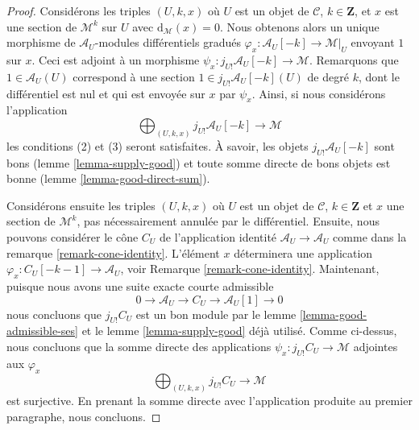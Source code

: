 \begin{proof}
Considérons les triples $(U, k, x)$ où $U$ est un objet de $\mathcal{C}$, $k \in \mathbf{Z}$, et $x$ est une section de $\mathcal{M}^k$ sur $U$ avec $\text{d}_\mathcal{M}(x) = 0$.
Nous obtenons alors un unique morphisme de $\mathcal{A}_U$-modules différentiels gradués $\varphi_x : \mathcal{A}_U[-k] \to \mathcal{M}|_U$ envoyant $1$ sur $x$.
Ceci est adjoint à un morphisme $\psi_x : j_{U!}\mathcal{A}_U[-k] \to \mathcal{M}$.
Remarquons que $1 \in \mathcal{A}_U(U)$ correspond à une section $1 \in j_{U!}\mathcal{A}_U[-k](U)$ de degré $k$, dont le différentiel est nul et qui est envoyée sur $x$ par $\psi_x$.
Ainsi, si nous considérons l'application
$$
\bigoplus\nolimits_{(U, k, x)} j_{U!}\mathcal{A}_U[-k]
\longrightarrow
\mathcal{M}
$$
les conditions (2) et (3) seront satisfaites.
À savoir, les objets $j_{U!}\mathcal{A}_U[-k]$ sont bons (lemme \ref{lemma-supply-good}) et toute somme directe de bons objets est bonne (lemme \ref{lemma-good-direct-sum}).

\medskip\noindent
Considérons ensuite les triples $(U, k, x)$ où $U$ est un objet de $\mathcal{C}$, $k \in \mathbf{Z}$ et $x$ une section de $\mathcal{M}^k$, pas nécessairement annulée par le différentiel.
Ensuite, nous pouvons considérer le cône $C_U$ de l'application identité $\mathcal{A}_U \to \mathcal{A}_U$ comme dans la remarque \ref{remark-cone-identity}.
L'élément $x$ déterminera une application $\varphi_x : C_U[-k - 1] \to \mathcal{A}_U$, voir Remarque \ref{remark-cone-identity}.
Maintenant, puisque nous avons une suite exacte courte admissible
$$
0 \to \mathcal{A}_U \to C_U \to \mathcal{A}_U[1] \to 0
$$
nous concluons que $j_{U!}C_U$ est un bon module par le lemme \ref{lemma-good-admissible-ses} et le lemme \ref{lemma-supply-good} déjà utilisé.
Comme ci-dessus, nous concluons que la somme directe des applications $\psi_x : j_{U!}C_U \to \mathcal{M}$ adjointes aux $\varphi_x$
$$
\bigoplus\nolimits_{(U, k, x)} j_{U!}C_U \longrightarrow \mathcal{M}
$$
est surjective.
En prenant la somme directe avec l'application produite au premier paragraphe, nous concluons.
\end{proof}

